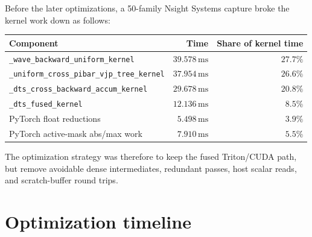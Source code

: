 \documentclass[11pt]{article}
\newcommand{\ms}{\,\mathrm{ms}}
\newcommand{\code}[1]{\texttt{#1}}
\begin{document}
Before the later optimizations, a 50-family Nsight Systems capture broke the
kernel work down as follows:

\begin{center}
\begin{tabular}{lrr}
\toprule
Component & Time & Share of kernel time \\
\midrule
\code{\_wave\_backward\_uniform\_kernel} & $39.578\ms$ & $27.7\%$ \\
\code{\_uniform\_cross\_pibar\_vjp\_tree\_kernel} & $37.954\ms$ & $26.6\%$ \\
\code{\_dts\_cross\_backward\_accum\_kernel} & $29.678\ms$ & $20.8\%$ \\
\code{\_dts\_fused\_kernel} & $12.136\ms$ & $8.5\%$ \\
PyTorch float reductions & $5.498\ms$ & $3.9\%$ \\
PyTorch active-mask abs/max work & $7.910\ms$ & $5.5\%$ \\
\bottomrule
\end{tabular}
\end{center}

The optimization strategy was therefore to keep the fused Triton/CUDA path, but
remove avoidable dense intermediates, redundant passes, host scalar reads, and
scratch-buffer round trips.

\section{Optimization timeline}
\end{document}
